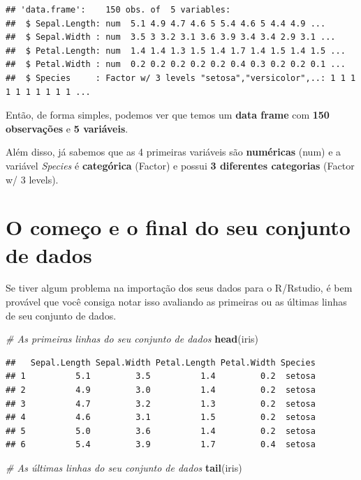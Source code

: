 \documentclass[
]{book}
\newenvironment{Shaded}{\begin{snugshade}}{\end{snugshade}}
\newcommand{\CommentTok}[1]{\textcolor[rgb]{0.56,0.35,0.01}{\textit{#1}}}
\newcommand{\KeywordTok}[1]{\textcolor[rgb]{0.13,0.29,0.53}{\textbf{#1}}}
\newcommand{\NormalTok}[1]{#1}
\begin{document}
\begin{verbatim}
## 'data.frame':    150 obs. of  5 variables:
##  $ Sepal.Length: num  5.1 4.9 4.7 4.6 5 5.4 4.6 5 4.4 4.9 ...
##  $ Sepal.Width : num  3.5 3 3.2 3.1 3.6 3.9 3.4 3.4 2.9 3.1 ...
##  $ Petal.Length: num  1.4 1.4 1.3 1.5 1.4 1.7 1.4 1.5 1.4 1.5 ...
##  $ Petal.Width : num  0.2 0.2 0.2 0.2 0.2 0.4 0.3 0.2 0.2 0.1 ...
##  $ Species     : Factor w/ 3 levels "setosa","versicolor",..: 1 1 1 1 1 1 1 1 1 1 ...
\end{verbatim}

Então, de forma simples, podemos ver que temos um \textbf{data frame}
com \textbf{150 observações} e \textbf{5 variáveis}.

Além disso, já sabemos que as 4 primeiras variáveis são
\textbf{numéricas} (num) e a variável \emph{Species} é
\textbf{categórica} (Factor) e possui \textbf{3 diferentes categorias}
(Factor w/ 3 levels).

\hypertarget{o-comeuxe7o-e-o-final-do-seu-conjunto-de-dados}{%
\section{O começo e o final do seu conjunto de
dados}\label{o-comeuxe7o-e-o-final-do-seu-conjunto-de-dados}}

Se tiver algum problema na importação dos seus dados para o R/Rstudio, é
bem provável que você consiga notar isso avaliando as primeiras ou as
últimas linhas de seu conjunto de dados.

\begin{Shaded}
\begin{Highlighting}[]
\CommentTok{# As primeiras linhas do seu conjunto de dados}
\KeywordTok{head}\NormalTok{(iris)}
\end{Highlighting}
\end{Shaded}

\begin{verbatim}
##   Sepal.Length Sepal.Width Petal.Length Petal.Width Species
## 1          5.1         3.5          1.4         0.2  setosa
## 2          4.9         3.0          1.4         0.2  setosa
## 3          4.7         3.2          1.3         0.2  setosa
## 4          4.6         3.1          1.5         0.2  setosa
## 5          5.0         3.6          1.4         0.2  setosa
## 6          5.4         3.9          1.7         0.4  setosa
\end{verbatim}

\begin{Shaded}
\begin{Highlighting}[]
\CommentTok{# As últimas linhas do seu conjunto de dados}
\KeywordTok{tail}\NormalTok{(iris)}
\end{Highlighting}
\end{Shaded}
\end{document}
